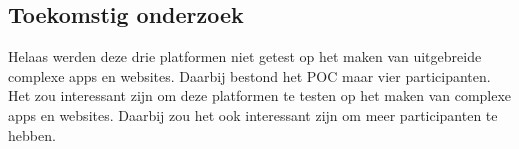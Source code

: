 \documentclass[a0,portrait]{hogent-poster}
\begin{document}
\begin{multicols}{2}
\section{Toekomstig onderzoek}
 Helaas werden deze drie platformen niet getest op het maken van uitgebreide complexe apps en websites. Daarbij bestond het POC maar vier participanten.
Het zou interessant zijn om deze platformen te testen op het maken van complexe apps en websites. Daarbij zou het ook interessant zijn om meer participanten te hebben.

\end{multicols}
\end{document}
